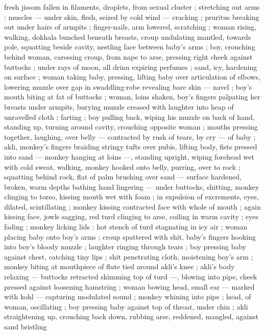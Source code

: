fresh jissom fallen in filaments, droplets, from sexual cluster ; 
stretching out arms : muscles --- under skin, flesh, seized by cold 
wind --- cracking ; pruritus breaking out under hairs of armpits ; 
finger-nails, arm lowered, scratching ; woman rising, walking, 
dokhala bunched beneath breasts, croup undulating mantled, 
towards pole, squatting beside cavity, nestling face between baby's 
arms ; boy, crouching behind woman, caressing croup, from nape to 
arse, pressing right cheek against buttocks ; under rays of moon, all 
drinn expiring perfumes ; sand, icy, hardening on surface ; woman 
taking baby, pressing, lifting baby over articulation of elbows, 
lowering muzzle over gap in swaddling-robe revealing bare skin --- 
navel ; boy's mouth biting at fat of buttocks ; woman, loins shaken, 
boy's fingers palpating her breasts under armpits, burying muzzle 
creased with laughter into heap of unravelled cloth ; farting ; boy 
pulling back, wiping his muzzle on back of hand, standing up, turning 
around cavity, crouching opposite woman ; mouths pressing together, 
laughing, over belly --- contracted by rush of tears, by cry --- of 
baby ; akli, monkey's fingers braiding stringy tufts over pubis, lifting 
body, fists pressed into sand --- monkey hanging at loins ---, 
standing upright, wiping forehead wet with cold sweat, walking, 
monkey hooked onto belly, purring, over to rock ; squatting behind 
rock, flat of palm brushing over sand --- surface hardened, broken, 
warm depths bathing hand lingering --- under buttocks, shitting, 
monkey clinging to torso, kissing mouth wet with foam ; in expulsion 
of excrements, eyes, dilated, scintillating ; monkey kissing 
contracted face with whole of mouth ; again kissing face, jowls 
sagging, red turd clinging to arse, coiling in warm cavity ; eyes fading 
; monkey licking lids : hot stench of turd stagnating in icy air ; woman 
placing baby onto boy's arms ; croup spattered with shit, baby's 
fingers hooking into boy's bloody muzzle ; laughter ringing through 
tears ; boy pressing baby against chest, catching tiny lips ; shit 
penetrating cloth, moistening boy's arm ; monkey biting at 
mouthpiece of flute tied around akli's knee ; akli's body relaxing --- 
buttocks retracted skimming top of turd ---, blowing into pipe, cheek 
pressed against loosening hamstring ; woman bowing head, small ear 
--- marked with kohl --- capturing modulated sound ; monkey 
whining into pipe ; head, of woman, oscillating ; boy pressing baby 
against top of throat, under chin ; akli straightening up, crouching 
back down, rubbing arse, reddened, mangled, against sand bristling 
